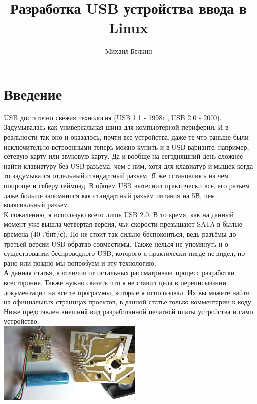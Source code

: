 \documentclass[12pt,a4paper]{article}
\begin{document}
\begin{titlepage}
\title{Разработка USB устройства ввода в Linux}
\author{Михаил Белкин}
\maketitle
\end{titlepage}

\tableofcontents
\newpage

\section{Введение}
    USB достаточно свежая технология (USB 1.1 - 1998г., USB 2.0 - 2000).
    Задумывалась как универсальная шина для компьютерной периферии.
    И в реальности так оно и оказалось, почти все устройства, даже те что
    раньше были исключительно встроенными теперь можно купить и в USB варианте,
    например, сетевую карту или звуковую карту. Да и вообще на сегодняшний
    день сложнее найти клавиатуру без USB разъема, чем с ним, хотя для
    клавиатур и мышек когда то задумывался отдельный стандартный разъем.
    Я же остановлюсь на чем попроще и соберу геймпад. В общем USB вытеснил
    практически все, его разъем даже больше запомнился как
    стандартный разъем питания на 5В, чем коаксиальный разъем.\\
    К сожалению, я использую всего лишь USB 2.0. В то время, как на данный момент
    уже вышла четвертая версия, чьи скорости превышают SATA в былые времена
    (40 Гбит/с). Но не стоит так сильно беспокоиться, ведь разъёмы до третьей
    версии USB обратно совместимы. Также нельзя не упомянуть и о существовании
    беспроводного USB, которого я практически нигде не видел, но рано или поздно
    мы попробуем и эту технологию.\\
    А данная статья, в отличии от остальных рассматривает процесс разработки
    всесторонне. Также нужно сказать что я не ставил цели в переписывании
    документации на все те программы, которые я использовал. Их вы
    можете найти на официальных страницах проектов, в данной статье только
    комментарии к коду. Ниже представлен внешний вид разработанной печатной
    платы устройства и само устройство.\\
\includegraphics[width=7cm]{pcb.jpg}
\end{document}
